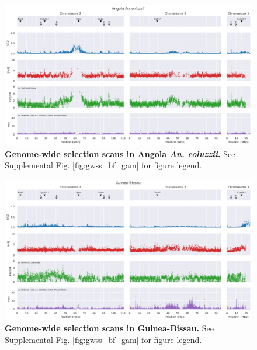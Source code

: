 \documentclass[a4paper,11pt,abstracton,hidelinks]{scrartcl}
\begin{document}
\begin{landscape}
\begin{figure}[t!]
	\begin{center}
		\includegraphics*[width=1.05\linewidth,center]{artwork/gwss_ao_col_gw_bf_col_gq_gam.png}
	\end{center}
	\caption[Genome-wide selection scans in Angola \textit{An. coluzzii}]{
	\textbf{Genome-wide selection scans in Angola \textit{An. coluzzii}.} 
	See Supplemental Fig. \ref{fig:gwss_bf_gam} for figure legend.
	} 
	\label{fig:gwss_ao_col}
\end{figure}


\begin{figure}[t!]
	\begin{center}
		\includegraphics*[width=1.05\linewidth,center]{artwork/gwss_gw_gq_gam_bf_col_gq_gam.png}
	\end{center}
	\caption[Genome-wide selection scans in Guinea-Bissau]{
	\textbf{Genome-wide selection scans in Guinea-Bissau.} 
	See Supplemental Fig. \ref{fig:gwss_bf_gam} for figure legend.
	} 
	\label{fig:gwss_gw}
\end{figure}




\end{landscape}
\end{document}
